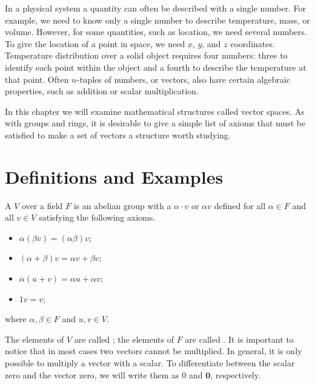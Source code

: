 

 
In a physical system a quantity can often be described with a single
number. For example, we need to know only a single number to describe
temperature, mass, or volume.  However, for some quantities, such as
location, we need several numbers. To give the location of a point in
space, we need $x$, $y$, and $z$ coordinates. Temperature
distribution over a solid object requires four numbers: three to
identify each point within the object and a fourth to describe the
temperature at that point.  Often $n$-tuples of numbers, or vectors,
also have certain algebraic properties, such as addition or scalar 
multiplication.  


In this chapter we will examine mathematical structures called vector
spaces. As with groups and rings, it is desirable to give a simple
list of axioms that must be satisfied to make a set of vectors a
structure worth studying.  
 
 
 
\section{Definitions and Examples}
 

A  $V$ over a
field $F$ is an abelian group with a  $\alpha \cdot v$ or $\alpha v$ defined
for all $\alpha \in F$ and all $v \in V$ satisfying the following
axioms.  
\begin{itemize}

\item 
$\alpha(\beta v) =(\alpha \beta)v$;

\item 
$(\alpha + \beta)v =\alpha v + \beta v$;

\item 
$\alpha(u + v) = \alpha u + \alpha v$;

\item 
$1v=v$;

\end{itemize}
where $\alpha, \beta \in F$ and $u, v \in V$.
 

The elements of $V$ are called ; the elements of $F$
are called .  It is important to notice that in most
cases two vectors cannot be multiplied.  In general, it is only
possible to multiply a vector with a scalar. To differentiate between
the scalar zero and the vector zero, we will write them as 0 and
${\mathbf 0}$, respectively.  


